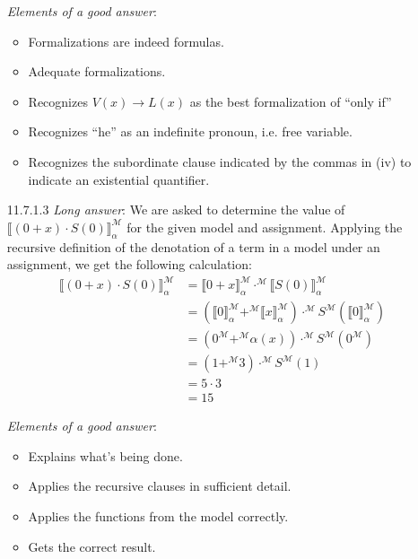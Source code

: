 \begin{itemize}
    \emph{Elements of a good answer}:

    \begin{itemize}
    \item Formalizations are indeed formulas.
    \item Adequate formalizations.
    \item Recognizes $V(x)\to L(x)$ as the best formalization of ``only
      if''
    \item Recognizes ``he'' as an indefinite pronoun, i.e. free
      variable.
      \item Recognizes the subordinate clause indicated by the commas
        in (iv) to indicate an existential quantifier.
    \end{itemize}

   \item[11.7.1.3] \emph{Long answer}: We are asked to determine the value of $\llbracket
     (0+x)\cdot S(0)\rrbracket^\mathcal{M}_\alpha$ for the given model
     and assignment. Applying the recursive definition of the
     denotation of a term in a model under an assignment, we get the
     following calculation:
     \begin{align*}
       \llbracket (0+x)\cdot
       S(0)\rrbracket^\mathcal{M}_\alpha&=\llbracket
                                          0+x\rrbracket^\mathcal{M}_\alpha\cdot^\mathcal{M} 
                                          \llbracket
                                          S(0)\rrbracket^\mathcal{M}_\alpha
       \\
       &=(\llbracket
         0\rrbracket^\mathcal{M}_\alpha+^\mathcal{M}\llbracket
         x\rrbracket^\mathcal{M}_\alpha)\cdot^\mathcal{M}
         S^\mathcal{M}(\llbracket 0\rrbracket^\mathcal{M}_\alpha)\\
                                        &=(0^\mathcal{M}+^\mathcal{M}\alpha(x))\cdot^\mathcal{M}S^\mathcal{M}(0^\mathcal{M})\\
                                        &=(1 +^\mathcal{M}3)\cdot ^\mathcal{M}S^\mathcal{M}(1)\\
                                        &= 5\cdot 3\\
                                        &=15
     \end{align*}

     \emph{Elements of a good answer}:

     \begin{itemize}
     \item Explains what's being done.
     \item Applies the recursive clauses in sufficient detail.
     \item Applies the functions from the model correctly.
     \item Gets the correct result.
     \end{itemize}


\end{itemize}
